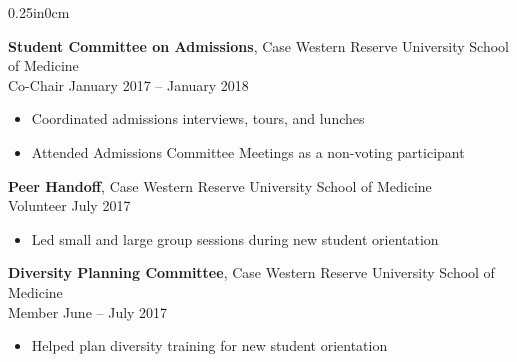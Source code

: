 \documentclass[11pt]{article}
\newcommand{\blockindent}{0.25in}
\newcommand{\job}[4]{
\textbf{#1}, {#2} \\
{#3} \hfill {#4}\\
}
\begin{document}
\begin{adjustwidth}{\blockindent}{0cm}
\job{Student Committee on Admissions}{Case Western Reserve University School of Medicine}{Co-Chair}{January 2017 -- January 2018}
\begin{itemize}
	\item Coordinated admissions interviews, tours, and lunches
	\item Attended Admissions Committee Meetings as a non-voting participant
\end{itemize}
\newpage

\job{Peer Handoff}{Case Western Reserve University School of Medicine}{Volunteer}{July 2017}
\begin{itemize}
	\item Led small and large group sessions during new student orientation
\end{itemize}

\job{Diversity Planning Committee}{Case Western Reserve University School of Medicine}{Member}{June -- July 2017}
\begin{itemize}
	\item Helped plan diversity training for new student orientation
\end{itemize}

\end{adjustwidth}

\end{document}
